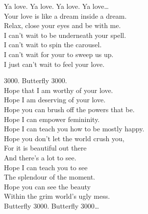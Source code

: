 Ya love. Ya love. Ya love. Ya love… \\

Your love is like a dream inside a dream. \\
Relax, close your eyes and be with me. \\

I can't wait to be underneath your spell. \\
I can't wait to spin the carousel. \\
I can't wait for your to sweep us up. \\
I just can't wait to feel your love. \\





 3000. Butterfly 3000. \\

Hope that I am worthy of your love. \\
Hope I am deserving of your love. \\
Hope you can brush off the powers that be. \\
Hope I can empower femininity. \\

Hope I can teach you how to be mostly happy. \\
Hope you don't let the world crush you, \\
For it is beautiful out there \\
And there's a lot to see. \\

Hope I can teach you to see \\
The splendour of the moment. \\
Hope you can see the beauty \\
Within the grim world's ugly mess. \\

Butterfly 3000. Butterfly 3000… \\
